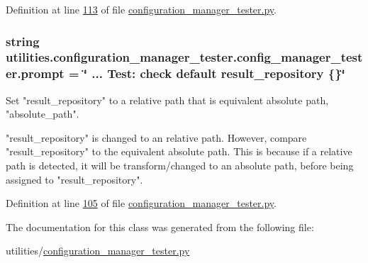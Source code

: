 Definition at line \hyperlink{configuration__manager__tester_8py_source_l00113}{113} of file \hyperlink{configuration__manager__tester_8py_source}{configuration\+\_\+manager\+\_\+tester.\+py}.

\hypertarget{classutilities_1_1configuration__manager__tester_1_1config__manager__tester_aa2904b10cd29c4fe16374fa249686be2}{}
\subsubsection[{prompt}]{\setlength{\rightskip}{0pt plus 5cm}string utilities.\+configuration\+\_\+manager\+\_\+tester.\+config\+\_\+manager\+\_\+tester.\+prompt = \char`\"{} ... Test\+: check default result\+\_\+repository \{\}\char`\"{}\hspace{0.3cm}{\ttfamily [static]}}\label{classutilities_1_1configuration__manager__tester_1_1config__manager__tester_aa2904b10cd29c4fe16374fa249686be2}
\begin{DoxyVerb}    Set "result_repository" to a relative path that is equivalent
absolute path, "absolute_path".
\end{DoxyVerb}
\begin{DoxyVerb}    "result_repository" is changed to an relative path.
    However, compare "result_repository" to the equivalent
absolute path.
    This is because if a relative path is detected, it will be
transform/changed to an absolute path, before being
assigned to "result_repository".
\end{DoxyVerb}
 

Definition at line \hyperlink{configuration__manager__tester_8py_source_l00105}{105} of file \hyperlink{configuration__manager__tester_8py_source}{configuration\+\_\+manager\+\_\+tester.\+py}.



The documentation for this class was generated from the following file\+:\begin{DoxyCompactItemize}
\item 
utilities/\hyperlink{configuration__manager__tester_8py}{configuration\+\_\+manager\+\_\+tester.\+py}\end{DoxyCompactItemize}
